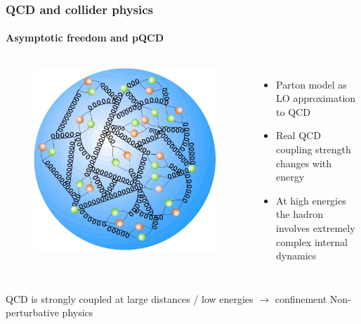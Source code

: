 \documentclass[aspectratio=43]{beamer}
\begin{document}
\begin{frame}

	\frametitle{QCD and collider physics}
	\framesubtitle{Asymptotic freedom and pQCD}

	\footnotesize
	
	\begin{columns}	
		
		
		\begin{figure}

			\includegraphics[width = 2 cm]{plots/part1/intro/proton2.jpg}
		\end{figure}
		
		
		\begin{itemize}
			\item Parton model as LO approximation to QCD
			\item Real QCD coupling strength changes with energy
			\item At high energies the hadron involves extremely complex internal dynamics
		\end{itemize}
		
	\end{columns}
	
	\vspace{1cm}
	\center \footnotesize QCD is strongly coupled at large distances / low energies $\longrightarrow$ confinement
	\center \footnotesize \color{red} Non-perturbative physics

\end{frame}
\end{document}
